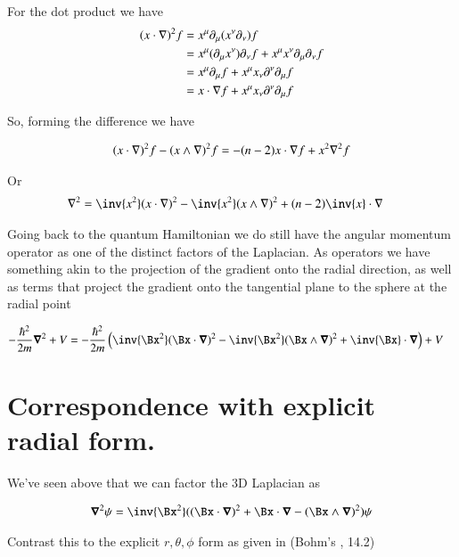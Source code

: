 For the dot product we have
\begin{align*}
(x \cdot \nabla)^2 f 
&=
x^\mu \partial_\mu( x^\nu \partial_\nu ) f \\
&=
x^\mu (\partial_\mu x^\nu) \partial_\nu  f + x^\mu x^\nu \partial_\mu \partial_\nu f \\
&=
x^\mu \partial_\mu f + x^\mu x_\nu \partial^\nu \partial_\mu f \\
&=
x \cdot \nabla f + x^\mu x_\nu \partial^\nu \partial_\mu f \\
\end{align*}

So, forming the difference we have

\begin{align*}
(x \cdot \nabla)^2 f - (x \wedge \nabla)^2 f &=
-(n - 2) x \cdot \nabla f + x^2 \nabla^2 f \\
\end{align*}

Or
\begin{align}
\grad^2 &= \inv{x^2} (x \cdot \grad)^2 - \inv{x^2} (x \wedge \grad)^2 + (n - 2) \inv{x} \cdot \grad 
\end{align}

Going back to the quantum Hamiltonian we do still have the angular momentum operator as one of the distinct factors of the Laplacian.  As operators we have something akin to the projection of the gradient onto the radial direction, as well as terms that project the gradient onto the tangential plane to the sphere at the radial point

\begin{align}
-\frac{\hbar^2}{2m} \spacegrad^2 + V
&=
-\frac{\hbar^2}{2m} \left( \inv{\Bx^2} (\Bx \cdot \spacegrad)^2 - \inv{\Bx^2} (\Bx \wedge \spacegrad)^2 + \inv{\Bx} \cdot \spacegrad \right) + V
\end{align}

\section{Correspondence with explicit radial form.}

We've seen above that we can factor the 3D Laplacian as 

\begin{align}\label{eqn:qmAngularMom:3dLaplacian}
\spacegrad^2 \psi = \inv{\Bx^2}( (\Bx \cdot \spacegrad)^2 + \Bx \cdot \spacegrad - (\Bx \wedge \spacegrad)^2) \psi
\end{align}

Contrast this to the explicit $r,\theta,\phi$ form as given in (Bohm's \cite{bohm1989qt}, 14.2)

